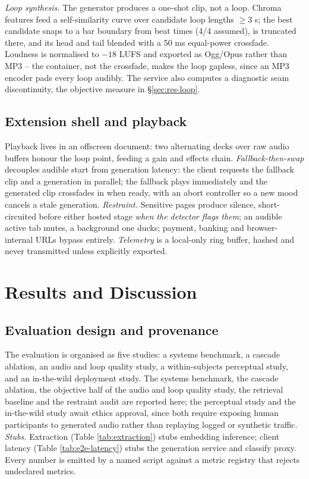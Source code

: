 \documentclass[conference]{IEEEtran}
\begin{document}
\emph{Loop synthesis.} The generator produces a one-shot clip, not a
loop. Chroma features feed a self-similarity curve \cite{foote} over
candidate loop lengths $\geq 3$ s; the best candidate snaps to a bar
boundary from beat times \cite{librosa} (4/4 assumed), is truncated
there, and its head and tail blended with a 50 ms equal-power crossfade.
Loudness is normalised to $-18$ LUFS \cite{ebu128} and exported as
Ogg/Opus \cite{opus} rather than MP3 -- the container, not the crossfade,
makes the loop gapless, since an MP3 encoder pads every loop audibly. The
service also computes a diagnostic seam discontinuity, the objective
measure in \S\ref{sec:res-loop}.

\subsection{Extension shell and playback}

Playback lives in an offscreen document: two alternating decks over raw
audio buffers honour the loop point, feeding a gain and effects chain.
\emph{Fallback-then-swap} decouples audible start from generation
latency: the client requests the fallback clip and a generation in
parallel; the fallback plays immediately and the generated clip
crossfades in when ready, with an abort controller so a new mood cancels
a stale generation. \emph{Restraint.} Sensitive pages produce silence,
short-circuited before either hosted stage \emph{when the detector flags
them}; an audible active tab mutes, a background one ducks; payment,
banking and browser-internal URLs bypass entirely. \emph{Telemetry} is
a local-only ring buffer, hashed and never transmitted unless explicitly
exported.

\section{Results and Discussion}
\label{sec:results}

\subsection{Evaluation design and provenance}
\label{sec:res-design}

The evaluation is organised as five studies: a systems benchmark, a cascade
ablation, an audio and loop quality study, a within-subjects perceptual
study, and an in-the-wild deployment study. The systems benchmark, the
cascade ablation, the objective half of the audio and loop quality study,
the retrieval baseline and the restraint audit are reported here; the
perceptual study and the in-the-wild study await ethics approval, since
both require exposing human participants to generated audio rather than
replaying logged or synthetic traffic. \emph{Stubs.} Extraction (Table
\ref{tab:extraction}) stubs embedding inference; client latency (Table
\ref{tab:e2e-latency}) stubs the generation service and classify proxy.
Every number is emitted by a named script against a metric registry that
rejects undeclared metrics.
\end{document}
